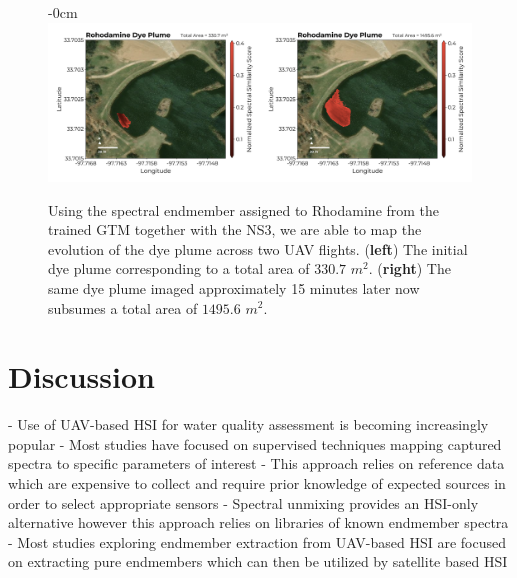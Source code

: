 \documentclass[remotesensing,article,submit,pdftex,moreauthors]{Definitions/mdpi}
\begin{document}
\begin{figure}[t]
\begin{adjustwidth}{-\extralength}{0cm}
\centering
\includegraphics[width=17.0cm]{paper/figures/results/rhodamine.png}
\end{adjustwidth}
\caption{Using the spectral endmember assigned to Rhodamine from the trained GTM together with the NS3, we are able to map the evolution of the dye plume across two UAV flights. (\textbf{left}) The initial dye plume corresponding to a total area of $330.7$ $m^2$. (\textbf{right}) The same dye plume imaged approximately 15 minutes later now subsumes a total area of $1495.6$ $m^2$.\label{fig:rhodamine-map}}
\end{figure}  




\section{Discussion}

- Use of UAV-based HSI for water quality assessment is becoming increasingly popular
- Most studies have focused on supervised techniques mapping captured spectra to specific parameters of interest 
- This approach relies on reference data which are expensive to collect and require prior knowledge of expected sources in order to select appropriate sensors 
- Spectral unmixing provides an HSI-only alternative however this approach relies on libraries of known endmember spectra
- Most studies exploring endmember extraction from UAV-based HSI are focused on extracting pure endmembers which can then be utilized by satellite based HSI
\end{document}
